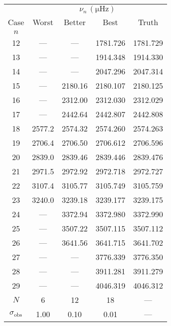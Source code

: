 \begin{tabular}{c|cccc}
\toprule
 & \multicolumn{4}{c}{$\nu_n \, (\mathrm{\mu Hz})$} \\
Case & Worst & Better & Best & Truth \\
$n$ &  &  &  &  \\
\midrule
12 & --- & --- & 1781.726 & 1781.729 \\
13 & --- & --- & 1914.348 & 1914.330 \\
14 & --- & --- & 2047.296 & 2047.314 \\
15 & --- & 2180.16 & 2180.107 & 2180.125 \\
16 & --- & 2312.00 & 2312.030 & 2312.029 \\
17 & --- & 2442.64 & 2442.807 & 2442.808 \\
18 & 2577.2 & 2574.32 & 2574.260 & 2574.263 \\
19 & 2706.4 & 2706.50 & 2706.612 & 2706.596 \\
20 & 2839.0 & 2839.46 & 2839.446 & 2839.476 \\
21 & 2971.5 & 2972.92 & 2972.718 & 2972.727 \\
22 & 3107.4 & 3105.77 & 3105.749 & 3105.759 \\
23 & 3240.0 & 3239.18 & 3239.177 & 3239.175 \\
24 & --- & 3372.94 & 3372.980 & 3372.990 \\
25 & --- & 3507.22 & 3507.115 & 3507.112 \\
26 & --- & 3641.56 & 3641.715 & 3641.702 \\
27 & --- & --- & 3776.339 & 3776.350 \\
28 & --- & --- & 3911.281 & 3911.279 \\
29 & --- & --- & 4046.319 & 4046.312 \\
\midrule%
$N$ & 6 & 12 & 18 & --- \\
$\sigma_\mathrm{obs}$ & 1.00 & 0.10 & 0.01 & --- \\
\bottomrule
\end{tabular}
